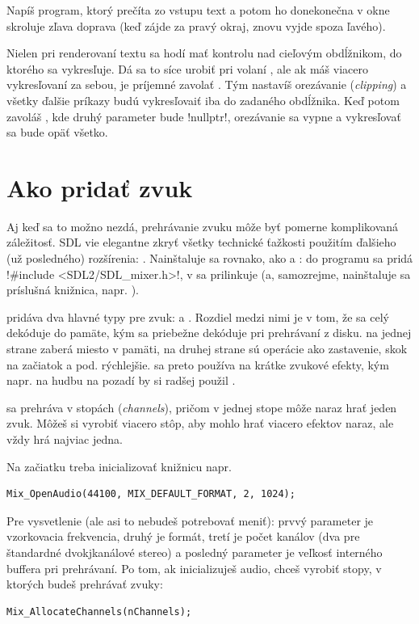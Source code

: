 \begin{uloha}
  Napíš program, ktorý prečíta zo vstupu text a potom ho donekonečna v okne skroluje zľava doprava (keď zájde za pravý okraj, znovu vyjde spoza ľavého).
\end{uloha}

Nielen pri renderovaní textu sa hodí mať kontrolu nad cieľovým obdĺžnikom, do ktorého 
sa vykresľuje. Dá sa to síce urobiť pri volaní , ale ak
máš viacero vykresľovaní za sebou, je príjemné zavolať
. Tým nastavíš orezávanie 
({\em clipping}) a všetky ďalšie príkazy budú vykresľovaiť iba do zadaného obdĺžnika. Keď
potom zavoláš , kde druhý parameter bude \prg!nullptr!,
orezávanie sa vypne a vykresľovať sa bude opäť všetko.

\section*{Ako pridať zvuk}

Aj keď sa to možno nezdá, prehrávanie zvuku môže byť pomerne komplikovaná záležitosť. SDL vie elegantne
zkryť všetky technické ťažkosti použitím ďalšieho (už posledného) rozšírenia: .
Nainštaluje sa rovnako, ako  a : do programu sa pridá
\prg!#include <SDL2/SDL_mixer.h>!, v  sa prilinkuje  (a, samozrejme,
nainštaluje sa príslušná knižnica, napr. ).

 pridáva dva hlavné typy pre zvuk:  a . Rozdiel 
medzi nimi je v tom, že  sa celý dekóduje do pamäte, kým 
 sa priebežne dekóduje pri prehrávaní z disku. 
 na jednej strane zaberá miesto 
v pamäti, na druhej strane sú operácie ako zastavenie, skok na začiatok a pod. rýchlejšie.
 sa preto používa na krátke zvukové efekty, kým napr. na hudbu na pozadí by si
radšej použil .

  sa prehráva v stopách ({\em channels}), pričom v jednej stope môže naraz hrať jeden zvuk. Môžeš si vyrobiť viacero stôp, aby mohlo hrať viacero efektov naraz,
ale  vždy hrá najviac jedna.

Na začiatku treba inicializovať knižnicu napr. 
\begin{lstlisting}
Mix_OpenAudio(44100, MIX_DEFAULT_FORMAT, 2, 1024);
\end{lstlisting}
Pre vysvetlenie (ale asi to nebudeš potrebovať meniť):
prvvý parameter je vzorkovacia frekvencia, druhý je formát, tretí je počet kanálov (dva pre štandardné dvokjkanálové stereo) a posledný parameter je veľkosť
interného buffera pri prehrávaní. Po tom, ak inicializuješ audio, chceš vyrobiť stopy, v ktorých budeš prehrávať zvuky:
\begin{lstlisting}
Mix_AllocateChannels(nChannels);
\end{lstlisting}

